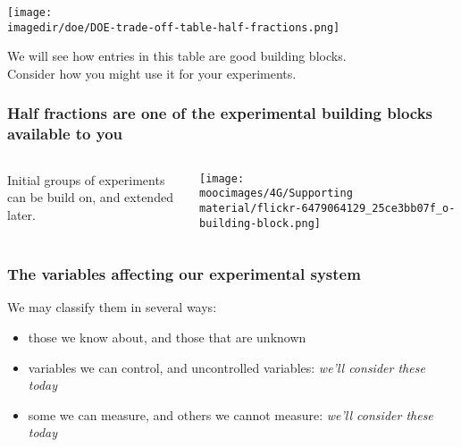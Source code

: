 \documentclass[handout,11pt,aspectratio=169,mathserif]{beamer}
\begin{document}
\begin{frame}\frametitle{}
	\texttt{[image: \\imagedir/doe/DOE-trade-off-table-half-fractions.png]}
	
	\vspace{-10pt}
	We will see how entries in this table are good building blocks.\\
	Consider how you might use it for your experiments.
\end{frame}

\begin{frame}\frametitle{Half fractions are  one of the experimental building blocks available to you}
	
	\begin{columns}[c]
		
	
			Initial groups of experiments can be build on, and extended later.
			
			
				\centerline{\texttt{[image: \\moocimages/4G/Supporting material/flickr-6479064129\_25ce3bb07f\_o-building-block.png]} \quad
				}
		
				
		
	\end{columns}
\end{frame}


\begin{frame}\frametitle{The variables affecting our experimental system}
	We may classify them in several ways:
	
	\begin{itemize}
		\item	those we know about, and those that are unknown
			\pause
		\item	variables we can control, and uncontrolled variables: \emph{we'll consider these today}
			\pause
		\item	some we can measure, and others we cannot measure: \emph{we'll consider these today}
		
	\end{itemize}	
\end{frame}
\end{document}
